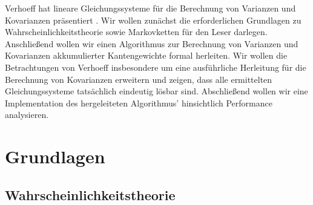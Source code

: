 \documentclass[a4paper]{article}
\theoremstyle{nonumberplain}
\begin{document}
Verhoeff hat lineare Gleichungssysteme für die Berechnung von Varianzen und Kovarianzen präsentiert \cite{Verh04}. Wir wollen zunächst die erforderlichen Grundlagen zu Wahrscheinlichkeitstheorie sowie Markovketten für den Leser darlegen. Anschließend wollen wir einen Algorithmus zur Berechnung von Varianzen und Kovarianzen akkumulierter Kantengewichte formal herleiten. Wir wollen  die Betrachtungen von Verhoeff insbesondere um eine ausführliche Herleitung für die Berechnung von Kovarianzen erweitern und zeigen, dass alle ermittelten Gleichungssysteme tatsächlich eindeutig lösbar sind. Abschließend wollen wir eine Implementation des hergeleiteten Algorithmus' hinsichtlich Performance analysieren.

\section{Grundlagen}

\subsection{Wahrscheinlichkeitstheorie}
\end{document}

